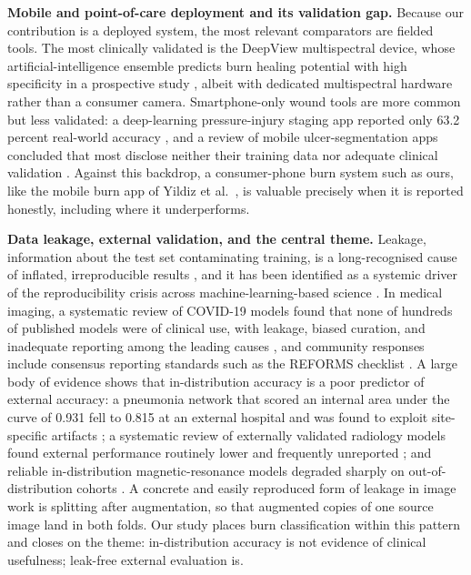 \documentclass{elektr}
\begin{document}
\textbf{Mobile and point-of-care deployment and its validation gap.} Because our contribution is a deployed system, the most relevant comparators are fielded tools. The most clinically validated is the DeepView multispectral device, whose artificial-intelligence ensemble predicts burn healing potential with high specificity in a prospective study \cite{thatcher2023}, albeit with dedicated multispectral hardware rather than a consumer camera. Smartphone-only wound tools are more common but less validated: a deep-learning pressure-injury staging app reported only 63.2 percent real-world accuracy \cite{lau2022}, and a review of mobile ulcer-segmentation apps concluded that most disclose neither their training data nor adequate clinical validation \cite{griffa2024}. Against this backdrop, a consumer-phone burn system such as ours, like the mobile burn app of Yildiz et al.\ \cite{yildiz}, is valuable precisely when it is reported honestly, including where it underperforms.

\textbf{Data leakage, external validation, and the central theme.} Leakage, information about the test set contaminating training, is a long-recognised cause of inflated, irreproducible results \cite{kaufman}, and it has been identified as a systemic driver of the reproducibility crisis across machine-learning-based science \cite{kapoor}. In medical imaging, a systematic review of COVID-19 models found that none of hundreds of published models were of clinical use, with leakage, biased curation, and inadequate reporting among the leading causes \cite{roberts}, and community responses include consensus reporting standards such as the REFORMS checklist \cite{reforms}. A large body of evidence shows that in-distribution accuracy is a poor predictor of external accuracy: a pneumonia network that scored an internal area under the curve of 0.931 fell to 0.815 at an external hospital and was found to exploit site-specific artifacts \cite{zech2018}; a systematic review of externally validated radiology models found external performance routinely lower and frequently unreported \cite{yu2022}; and reliable in-distribution magnetic-resonance models degraded sharply on out-of-distribution cohorts \cite{martensson2020}. A concrete and easily reproduced form of leakage in image work is splitting after augmentation, so that augmented copies of one source image land in both folds. Our study places burn classification within this pattern and closes on the theme: in-distribution accuracy is not evidence of clinical usefulness; leak-free external evaluation is.
\end{document}

